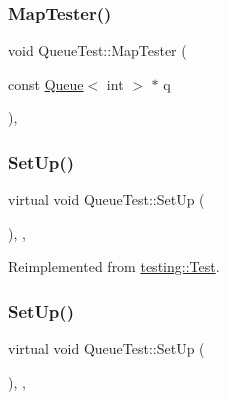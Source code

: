 \subsubsection{\texorpdfstring{Map\+Tester()}{MapTester()}}
{\footnotesize\ttfamily void Queue\+Test\+::\+Map\+Tester (\begin{DoxyParamCaption}\item[{const \hyperlink{class_queue}{Queue}$<$ int $>$ $\ast$}]{q }\end{DoxyParamCaption})\hspace{0.3cm}{\ttfamily [inline]}, {\ttfamily [protected]}}

\mbox{\label{class_queue_test_a91e69958f086239a523864d6b94ab174}} 
\subsubsection{\texorpdfstring{Set\+Up()}{SetUp()}\hspace{0.1cm}{\footnotesize\ttfamily [1/2]}}
{\footnotesize\ttfamily virtual void Queue\+Test\+::\+Set\+Up (\begin{DoxyParamCaption}{ }\end{DoxyParamCaption})\hspace{0.3cm}{\ttfamily [inline]}, {\ttfamily [protected]}, {\ttfamily [virtual]}}



Reimplemented from \hyperlink{classtesting_1_1_test_a190315150c303ddf801313fd1a777733}{testing\+::\+Test}.

\mbox{\label{class_queue_test_a91e69958f086239a523864d6b94ab174}} 
\subsubsection{\texorpdfstring{Set\+Up()}{SetUp()}\hspace{0.1cm}{\footnotesize\ttfamily [2/2]}}
{\footnotesize\ttfamily virtual void Queue\+Test\+::\+Set\+Up (\begin{DoxyParamCaption}{ }\end{DoxyParamCaption})\hspace{0.3cm}{\ttfamily [inline]}, {\ttfamily [protected]}, {\ttfamily [virtual]}}



